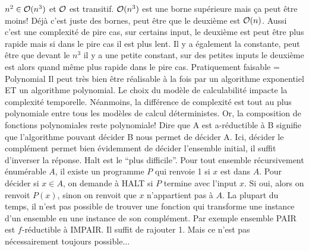 \begin{mcqs}
  {$n^2 \in \mathcal{O}(n^3)$ et $\mathcal{O}$ est transitif.}
  {$\mathcal{O}(n^{3})$ est une borne supérieure mais ça peut être moins!}
  {Déjà c'est juste des bornes, peut être que le deuxième est $\mathcal{O}(n)$.
  Aussi c'est une complexité de pire cas, sur certains input, le deuxième est peut être plus rapide mais si dans le pire cas il est plus lent.
  Il y a également la constante, peut être que devant le $n^3$ il y a une petite constant, sur des petites inputs le deuxième est alors quand même plus rapide dans le pire cas.}
  {Pratiquement faisable = Polynomial}
  {Il peut très bien être réalisable à la fois par un algorithme exponentiel ET un algorithme polynomial.}
  {Le choix du modèle de calculabilité impacte la complexité temporelle. Néanmoins, la différence de complexité est tout au plus polynomiale entre tous les modèles de calcul déterministes. Or, la composition de fonctions polynomiales reste polynomiale!}
  {Dire que A est a-réductible à B signifie que l'algorithme pouvant décider B nous permet de décider A. Ici, décider le complément permet bien évidemment de décider l'ensemble initial, il suffit d'inverser la réponse.}
  {Halt est le ``plus difficile''. Pour tout ensemble récursivement énumérable $A$, il existe un programme $P$ qui renvoie 1 si $x$ est dans $A$. Pour décider si $x \in A$, on demande à HALT si $P$ termine avec l'input $x$. Si oui, alors on renvoit $P(x)$, sinon on renvoit que $x$ n'appartient pas à $A$.}
  {La plupart du temps, il n'est pas possible de trouver une fonction qui transforme une instance d'un ensemble en une instance de son complément. Par exemple ensemble PAIR est $f$-réductible à IMPAIR. Il suffit de rajouter 1. Mais ce n'est pas nécessairement toujours possible...
}
\end{mcqs}
